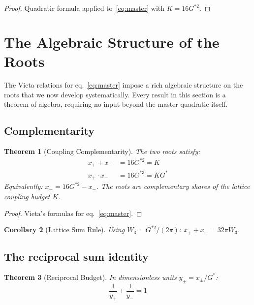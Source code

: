 \documentclass[12pt]{article}
\newtheorem{theorem}{Theorem}[section]
\newtheorem{corollary}[theorem]{Corollary}
\theoremstyle{definition}
\theoremstyle{remark}
\begin{document}
\begin{proof}
Quadratic formula applied to~\eqref{eq:master} with $K = 16G^{*2}$.
\end{proof}

\section{The Algebraic Structure of the Roots}
\label{sec:roots-structure}

The Vieta relations for eq.~\eqref{eq:master} impose a rich algebraic structure on the roots that we now develop systematically. Every result in this section is a theorem of algebra, requiring no input beyond the master quadratic itself.

\subsection{Complementarity}

\begin{theorem}[Coupling Complementarity]
\label{thm:complementarity}
The two roots satisfy:
\begin{align}
    x_+ + x_- &= 16G^{*2} = K \label{eq:vieta-sum}\\
    x_+ \cdot x_- &= 16G^{*3} = KG^* \label{eq:vieta-prod}
\end{align}
Equivalently: $x_+ = 16G^{*2} - x_-$. The roots are complementary shares of the lattice coupling budget $K$.
\end{theorem}

\begin{proof}
Vieta's formulas for eq.~\eqref{eq:master}. \qedhere
\end{proof}

\begin{corollary}[Lattice Sum Rule]
Using $W_3 = G^{*2}/(2\pi)$\emph{:} $x_+ + x_- = 32\pi W_3$.
\end{corollary}

\subsection{The reciprocal sum identity}

\begin{theorem}[Reciprocal Budget]
\label{thm:reciprocal}
In dimensionless units $y_\pm = x_\pm / G^*$\emph{:}
\begin{equation}
    \boxed{\;\frac{1}{y_+} + \frac{1}{y_-} = 1\;}
    \label{eq:reciprocal}
\end{equation}
\end{theorem}
\end{document}
